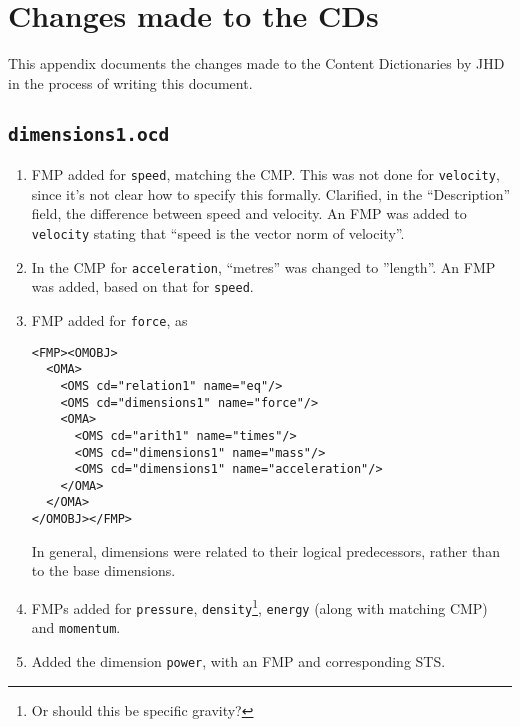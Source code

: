 \documentclass[11pt]{openmathTN}
\begin{document}
\section{Changes made to the CDs}
This appendix documents the changes made to the Content Dictionaries by JHD
in the process of writing this document.
\subsection{{\tt dimensions1.ocd}}
\begin{enumerate}
\item FMP added for {\tt speed}, matching the CMP. This was not done for
{\tt velocity}, since it's not clear how to specify this formally.
Clarified, in the ``Description'' field, the difference between speed and
velocity. An FMP was added to {\tt velocity} stating that ``speed is the 
vector norm of velocity''.
\item In the CMP for {\tt acceleration}, ``metres'' was changed to
''length''. An FMP was added, based on that for {\tt speed}.
\item FMP added for {\tt force}, as
\begin{verbatim}
<FMP><OMOBJ>
  <OMA>
    <OMS cd="relation1" name="eq"/>
    <OMS cd="dimensions1" name="force"/>
    <OMA>
      <OMS cd="arith1" name="times"/>
      <OMS cd="dimensions1" name="mass"/>
      <OMS cd="dimensions1" name="acceleration"/>
    </OMA>
  </OMA>
</OMOBJ></FMP>
\end{verbatim}
In general, dimensions were related to their logical predecessors, rather
than to the base dimensions.
\item FMPs added for {\tt pressure}, {\tt density}\footnote{Or should this
be specific gravity?}, {\tt energy} (along with matching CMP) and
\verb+momentum+.
\item Added the dimension \verb+power+, with an FMP and corresponding STS.
\end{enumerate}
\end{document}
